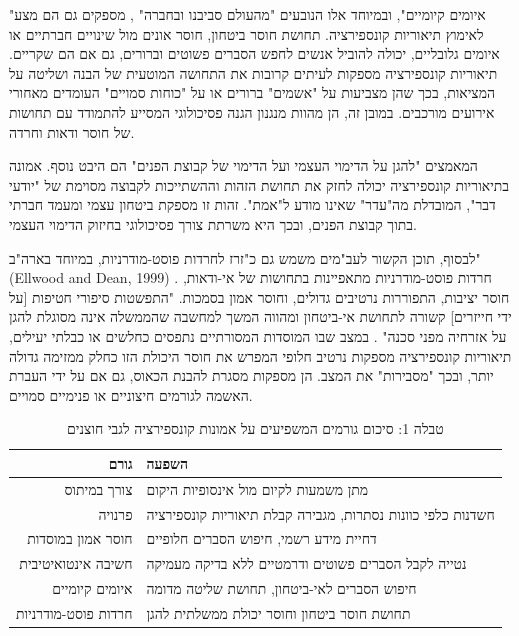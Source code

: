 \documentclass[12pt,a4paper]{article}
\begin{document}
"איומים קיומיים", ובמיוחד אלו הנובעים "מהעולם סביבנו ובחברה" \cite{biddlestone2025conspiracy}, מספקים גם הם מצע לאימוץ תיאוריות קונספירציה. תחושת חוסר ביטחון, חוסר אונים מול שינויים חברתיים או איומים גלובליים, יכולה להוביל אנשים לחפש הסברים פשוטים וברורים, גם אם הם שקריים. תיאוריות קונספירציה מספקות לעיתים קרובות את התחושה המוטעית של הבנה ושליטה על המציאות, בכך שהן מצביעות על "אשמים" ברורים או על "כוחות סמויים" העומדים מאחורי אירועים מורכבים. במובן זה, הן מהוות מנגנון הגנה פסיכולוגי המסייע להתמודד עם תחושות של חוסר ודאות וחרדה.

המאמצים "להגן על הדימוי העצמי ועל הדימוי של קבוצת הפנים" \cite{biddlestone2025conspiracy} הם היבט נוסף. אמונה בתיאוריות קונספירציה יכולה לחזק את תחושת הזהות וההשתייכות לקבוצה מסוימת של "יודעי דבר", המובדלת מה"עדר" שאינו מודע ל"אמת". זהות זו מספקת ביטחון עצמי ומעמד חברתי בתוך קבוצת הפנים, ובכך היא משרתת צורך פסיכולוגי בחיזוק הדימוי העצמי.

לבסוף, תוכן הקשור לעב"מים משמש גם כ"זרז לחרדות פוסט-מודרניות, במיוחד בארה"ב" (Ellwood and Dean, 1999) \cite{ellwood1999ufo}. חרדות פוסט-מודרניות מתאפיינות בתחושות של אי-ודאות, חוסר יציבות, התפוררות נרטיבים גדולים, וחוסר אמון בסמכות. "התפשטות סיפורי חטיפות [על ידי חייזרים] קשורה לתחושת אי-ביטחון ומהווה המשך למחשבה שהממשלה אינה מסוגלת להגן על אזרחיה מפני סכנה" \cite{ellwood1999ufo}. במצב שבו המוסדות המסורתיים נתפסים כחלשים או כבלתי יעילים, תיאוריות קונספירציה מספקות נרטיב חלופי המפרש את חוסר היכולת הזו כחלק ממזימה גדולה יותר, ובכך "מסבירות" את המצב. הן מספקות מסגרת להבנת הכאוס, גם אם על ידי העברת האשמה לגורמים חיצוניים או פנימיים סמויים.

\begin{table}[h!]
    \centering
    \caption{טבלה 1: סיכום גורמים המשפיעים על אמונות קונספירציה לגבי חוצנים}
    \label{tab:conspiracy_factors}
    \begin{tabular}{|r|l|}
    \hline
    \textbf{גורם} & \textbf{השפעה} \\
    \hline
    צורך במיתוס & מתן משמעות לקיום מול אינסופיות היקום \\
    פרנויה & חשדנות כלפי כוונות נסתרות, מגבירה קבלת תיאוריות קונספירציה \\
    חוסר אמון במוסדות & דחיית מידע רשמי, חיפוש הסברים חלופיים \\
    חשיבה אינטואיטיבית & נטייה לקבל הסברים פשוטים ודרמטיים ללא בדיקה מעמיקה \\
    איומים קיומיים & חיפוש הסברים לאי-ביטחון, תחושת שליטה מדומה \\
    חרדות פוסט-מודרניות & תחושת חוסר ביטחון וחוסר יכולת ממשלתית להגן \\
    \hline
    \end{tabular}
\end{table}
\end{document}
